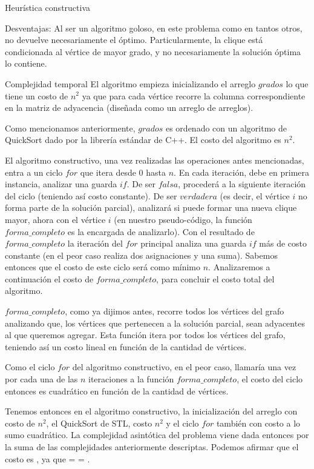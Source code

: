 \begin{section}{Heurística constructiva}
\begin{subsection}{Desventajas: }
			Al ser un algoritmo goloso, en este problema como en tantos otros, no devuelve necesariamente el óptimo. Particularmente, la clique está condicionada al vértice de mayor grado, y no necesariamente la solución óptima lo contiene.
		\end{subsection}
		\begin{subsection}{Complejidad temporal}
			El algoritmo empieza inicializando el arreglo $grados$ lo que tiene un costo de $n^2$ ya que para cada vértice recorre la columna correspondiente en la matriz de adyacencia (diseñada como un arreglo de arreglos).
			
			Como mencionamos anteriormente, $grados$ es ordenado con un algoritmo de QuickSort dado por la librería estándar de C++. El costo del algoritmo es $n^2$.
			
			El algoritmo constructivo, una vez realizadas las operaciones antes mencionadas, entra a un ciclo $for$ que itera desde $0$ hasta $n$. En cada iteración, debe en primera instancia, analizar una guarda $if$. De ser $falsa$, procederá a la siguiente iteración del ciclo (teniendo así costo constante). De ser $verdadera$ (es decir, el vértice $i$ no forma parte de la solución parcial), analizará si puede formar una nueva clique mayor, ahora con el vértice $i$ (en nuestro pseudo-código, la función $forma\_completo$ es la encargada de analizarlo). Con el resultado de $forma\_completo$ la iteración del $for$ principal analiza una guarda $if$ más de costo constante (en el peor caso realiza dos asignaciones y una suma). Sabemos entonces que el costo de este ciclo será como mínimo $n$. Analizaremos a continuación el costo de $forma\_completo$, para concluir el costo total del algoritmo.
			
			$forma\_completo$, como ya dijimos antes, recorre todos los vértices del grafo analizando que, los vértices que pertenecen a la solución parcial, sean adyacentes al que queremos agregar. Esta función itera por todos los vértices del grafo, teniendo así un costo lineal en función de la cantidad de vértices.
			
			Como el ciclo $for$ del algoritmo constructivo, en el peor caso, llamaría una vez por cada una de las $n$ iteraciones a la función $forma\_completo$, el costo del ciclo entonces es cuadrático en función de la cantidad de vértices.
			
			Tenemos entonces en el algoritmo constructivo, la inicialización del arreglo con costo de $n^2$, el QuickSort de STL, costo $n^2$ y el ciclo $for$ también con costo a lo sumo cuadrático. La complejidad asintótica del problema viene dada entonces por la suma de las complejidades anteriormente descriptas. Podemos afirmar que el costo es , ya que  =  = .
			
		\end{subsection}

\end{section}

